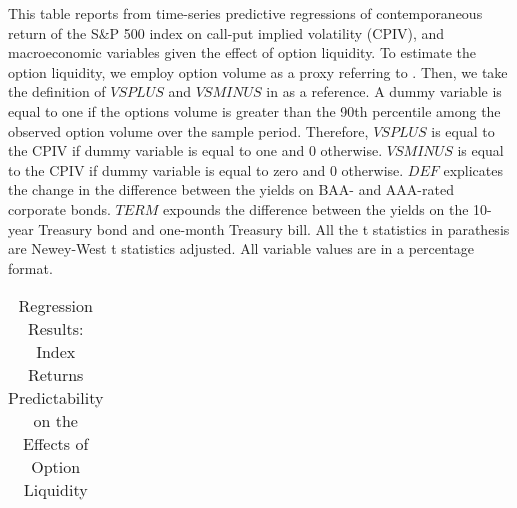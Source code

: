 \begin{table}[h]

\caption{Regression Results: Index Returns Predictability on the Effects of Option Liquidity}\label{table:Volume}
\begin{threeparttable}

\medskip
\begin{spacing}{1.1}
{\scriptsize  
This table reports from time-series predictive regressions of contemporaneous return of the S\&P 500 index on call-put implied volatility (CPIV), and macroeconomic variables given the effect of option liquidity. To estimate the option liquidity, we employ option volume as a proxy referring to \textcite{chang2018implied}. Then, we take the definition of $VSPLUS$ and $VSMINUS$ in \textcite{atilgan2015implied} as a reference. A dummy variable is equal to one if the options volume is greater than the 90th percentile among the observed option volume over the sample period. Therefore, $VSPLUS$ is equal to the CPIV if dummy variable is equal to one and 0 otherwise. $VSMINUS$ is equal to the CPIV if dummy variable is equal to zero and 0 otherwise. $DEF$ explicates the change in the difference between the yields on BAA- and AAA-rated corporate bonds. $TERM$ expounds the difference between the yields on the 10-year Treasury bond and one-month Treasury bill. All the t statistics in parathesis are Newey-West t statistics adjusted. All variable values are in a percentage format. 
}
\end{spacing}
\medskip
\medskip
\tiny
\centering
\begin{tabular}{ccccccccccccccc}
\toprule


\end{tabular}
\end{threeparttable}
\end{table}
